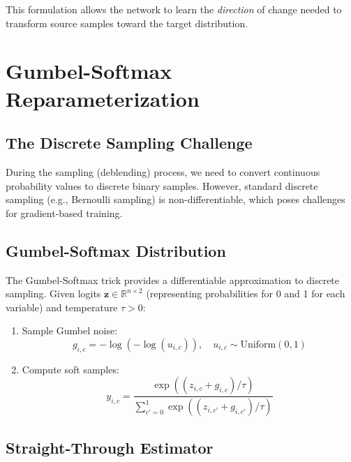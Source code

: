 \documentclass[11pt,a4paper]{article}
\newcommand{\R}{\mathbb{R}}
\begin{document}
This formulation allows the network to learn the \emph{direction} of change needed to transform source samples toward the target distribution.

\section{Gumbel-Softmax Reparameterization}

\subsection{The Discrete Sampling Challenge}

During the sampling (deblending) process, we need to convert continuous probability values to discrete binary samples. However, standard discrete sampling (e.g., Bernoulli sampling) is non-differentiable, which poses challenges for gradient-based training.

\subsection{Gumbel-Softmax Distribution}

The Gumbel-Softmax trick provides a differentiable approximation to discrete sampling. Given logits $\mathbf{z} \in \R^{n \times 2}$ (representing probabilities for 0 and 1 for each variable) and temperature $\tau > 0$:

\begin{enumerate}
    \item Sample Gumbel noise:
    \begin{equation}
        g_{i,c} = -\log(-\log(u_{i,c})), \quad u_{i,c} \sim \text{Uniform}(0,1)
    \end{equation}

    \item Compute soft samples:
    \begin{equation}
        y_{i,c} = \frac{\exp((z_{i,c} + g_{i,c})/\tau)}{\sum_{c'=0}^{1} \exp((z_{i,c'} + g_{i,c'})/\tau)}
    \end{equation}
\end{enumerate}

\subsection{Straight-Through Estimator}
\end{document}
